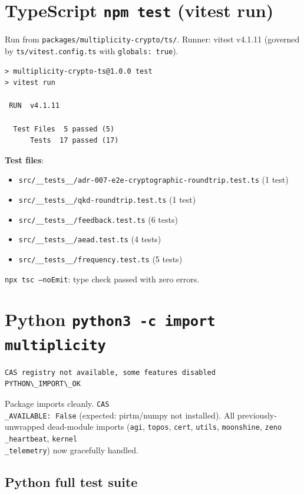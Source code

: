 \documentclass[11pt]{article}
\begin{document}
\section{TypeScript \texttt{npm test} (vitest run)}

Run from \texttt{packages/multiplicity-crypto/ts/}. Runner: vitest v4.1.11
(governed by \texttt{ts/vitest.config.ts} with \texttt{globals: true}).

\begin{verbatim}
> multiplicity-crypto-ts@1.0.0 test
> vitest run

 RUN  v4.1.11

  Test Files  5 passed (5)
      Tests  17 passed (17)
\end{verbatim}

\textbf{Test files}:
\begin{itemize}
  \item \texttt{src/\_\_tests\_\_/adr-007-e2e-cryptographic-roundtrip.test.ts} (1 test)
  \item \texttt{src/\_\_tests\_\_/qkd-roundtrip.test.ts} (1 test)
  \item \texttt{src/\_\_tests\_\_/feedback.test.ts} (6 tests)
  \item \texttt{src/\_\_tests\_\_/aead.test.ts} (4 tests)
  \item \texttt{src/\_\_tests\_\_/frequency.test.ts} (5 tests)
\end{itemize}

\texttt{npx tsc --noEmit}: type check passed with zero errors.

\section{Python \texttt{python3 -c import multiplicity}}

\begin{verbatim}
CAS registry not available, some features disabled
PYTHON\_IMPORT\_OK
\end{verbatim}

Package imports cleanly. \texttt{CAS\\_AVAILABLE: False} (expected: pirtm/numpy not installed).
All previously-unwrapped dead-module imports (\texttt{agi}, \texttt{topos}, \texttt{cert}, \texttt{utils}, \texttt{moonshine}, \texttt{zeno\\_heartbeat}, \texttt{kernel\\_telemetry}) now gracefully handled.

\subsection{Python full test suite}
\end{document}
